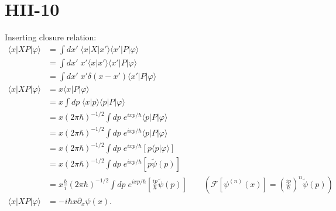 \documentclass[letterpaper,11pt,twoside]{article}
\newcommand{\braket}[1]{\langle#1\rangle}
\begin{document}
\section*{HII-10}
Inserting closure relation:
\begin{align*}
  \braket{x|XP|\varphi}&=\int dx'\; \braket{x|X|x'}\braket{x'|P|\varphi}\\
  &=\int dx'\;x'\braket{x|x'}\braket{x'|P|\varphi}\\
  &=\int dx'\; x'\delta(x-x')\braket{x'|P|\varphi}\\
  \braket{x|XP|\varphi}&=x\braket{x|P|\varphi}\\
  &=x\int dp\;\braket{x|p}\braket{p|P|\varphi}\\
  &=x(2\pi\hbar)^{-1/2}\int dp\;e^{ixp/\hbar}\braket{p|P|\varphi}\\
  &=x(2\pi\hbar)^{-1/2}\int dp\;e^{ixp/\hbar}\braket{p|P|\varphi}\\
  &=x(2\pi\hbar)^{-1/2}\int dp\;e^{ixp/\hbar}[p\braket{p|\varphi}]\\
  &=x(2\pi\hbar)^{-1/2}\int dp\;e^{ixp/\hbar}[p\tilde{\psi}(p)]\\
  &=x\frac{\hbar}{i}(2\pi\hbar)^{-1/2}\int dp\;e^{ixp/\hbar}\left[\frac{ip}{\hbar}\tilde{\psi}(p)\right]\qquad\left(\mathscr{F}[\psi^{(n)}(x)]=\left(\frac{ip}{\hbar}\right)^n\tilde{\psi}(p)\right)\\
  \braket{x|XP|\varphi}&=-i\hbar x\partial_x\psi(x).
\end{align*}




%
\end{document}
